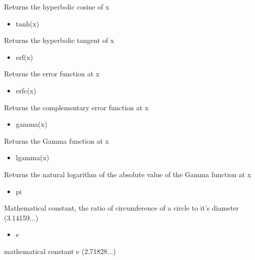 \documentclass[11pt]{article}
\providecommand{\tightlist}{%
      \setlength{\itemsep}{0pt}\setlength{\parskip}{0pt}}
\begin{document}
Returns the hyperbolic cosine of x

\begin{itemize}
\tightlist
\item
  tanh(x)
\end{itemize}

Returns the hyperbolic tangent of x

\begin{itemize}
\tightlist
\item
  erf(x)
\end{itemize}

Returns the error function at x

\begin{itemize}
\tightlist
\item
  erfc(x)
\end{itemize}

Returns the complementary error function at x

\begin{itemize}
\tightlist
\item
  gamma(x)
\end{itemize}

Returns the Gamma function at x

\begin{itemize}
\tightlist
\item
  lgamma(x)
\end{itemize}

Returns the natural logarithm of the absolute value of the Gamma
function at x

\begin{itemize}
\tightlist
\item
  pi
\end{itemize}

Mathematical constant, the ratio of circumference of a circle to it's
diameter (3.14159...)

\begin{itemize}
\tightlist
\item
  e
\end{itemize}

mathematical constant e (2.71828...)
\end{document}
